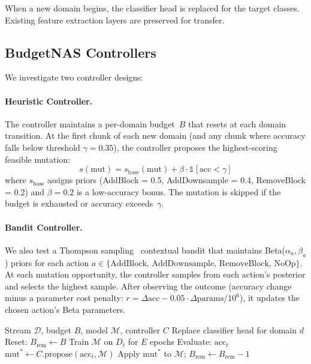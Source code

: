 \documentclass[10pt,twocolumn,letterpaper]{article}
\begin{document}
When a new domain begins, the classifier head is replaced for the target classes. Existing feature extraction layers are preserved for transfer.

\subsection{BudgetNAS Controllers}

We investigate two controller designs:

\paragraph{Heuristic Controller.}
The controller maintains a per-domain budget~$B$ that resets at each domain transition. At the first chunk of each new domain (and any chunk where accuracy falls below threshold $\gamma = 0.35$), the controller proposes the highest-scoring feasible mutation:
\begin{equation}
    s(\text{mut}) = s_{\text{base}}(\text{mut}) + \beta \cdot \mathbb{1}[\text{acc} < \gamma]
\end{equation}
where $s_{\text{base}}$ assigns priors (AddBlock = 0.5, AddDownsample = 0.4, RemoveBlock = 0.2) and $\beta = 0.2$ is a low-accuracy bonus. The mutation is skipped if the budget is exhausted or accuracy exceeds~$\gamma$.

\paragraph{Bandit Controller.}
We also test a Thompson sampling~\cite{thompson1933likelihood,chapelle2011empirical} contextual bandit that maintains Beta($\alpha_a, \beta_a$) priors for each action $a \in \{\text{AddBlock, AddDownsample, RemoveBlock, NoOp}\}$. At each mutation opportunity, the controller samples from each action's posterior and selects the highest sample. After observing the outcome (accuracy change minus a parameter cost penalty: $r = \Delta\text{acc} - 0.05 \cdot \Delta\text{params}/10^6$), it updates the chosen action's Beta parameters.

\begin{algorithm}[t]
\caption{BudgetNAS Online Loop}
\label{alg:budgetnas}
\begin{algorithmic}[1]
\REQUIRE Stream $\mathcal{D}$, budget $B$, model $\mathcal{M}$, controller $C$
    \STATE Replace classifier head for domain $d$
    \STATE Reset: $B_{\text{rem}} \leftarrow B$
        \STATE Train $\mathcal{M}$ on $D_t$ for $E$ epochs
        \STATE Evaluate: $\text{acc}_t$
            \STATE $\text{mut}^* \leftarrow C.\text{propose}(\text{acc}_t, \mathcal{M})$
            \STATE Apply $\text{mut}^*$ to $\mathcal{M}$; $B_{\text{rem}} \leftarrow B_{\text{rem}} - 1$
        \ENDIF
    \ENDFOR
\ENDFOR
\end{algorithmic}
\end{algorithm}
\end{document}

